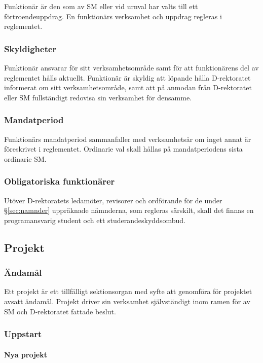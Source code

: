 \documentclass{dgovdoc}
\begin{document}
Funktionär är den som av SM eller vid urnval har valts till ett
förtroendeuppdrag. En funktionärs verksamhet och uppdrag regleras i
reglementet.

\subsubsection{Skyldigheter}

Funktionär ansvarar för sitt verksamhetsområde samt för att funktionärens del
av reglementet hålls aktuellt. Funktionär är skyldig att löpande hålla
D-rektoratet informerat om sitt verksamhetsområde, samt att på anmodan från
D-rektoratet eller SM fullständigt redovisa sin verksamhet för densamme.

\subsubsection{Mandatperiod}

Funktionärs mandatperiod sammanfaller med verksamhetsår om inget annat är
föreskrivet i reglementet. Ordinarie val skall hållas på mandatperiodens sista
ordinarie SM.

\subsubsection{Obligatoriska funktionärer}

Utöver D-rektoratets ledamöter, revisorer och ordförande för de under
\S\ref{sec:namnder} uppräknade nämnderna, som regleras särskilt, skall det
finnas en programansvarig student och ett studerandeskyddsombud.

\subsection{Projekt}

\subsubsection{Ändamål}

Ett projekt är ett tillfälligt sektionsorgan med syfte att genomföra för
projektet avsatt ändamål. Projekt driver sin verksamhet självständigt inom
ramen för av SM och D-rektoratet fattade beslut.

\subsubsection{Uppstart}

\paragraph{Nya projekt}
\end{document}
